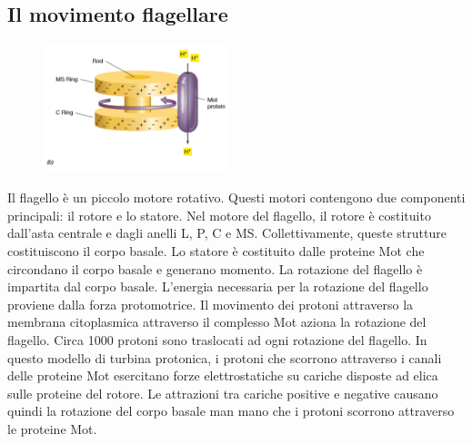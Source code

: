 \subsection{Il movimento flagellare}
\begin{figure}
  \begin{center}
    \includegraphics[width=0.48\textwidth]{Pictures/17.png}
  \end{center}
\end{figure}
Il flagello è un piccolo motore rotativo. Questi motori contengono due componenti principali: il rotore e lo statore. Nel motore del flagello, il rotore è 
costituito dall'asta centrale e dagli anelli L, P, C e MS. Collettivamente, queste strutture costituiscono il corpo basale. Lo statore è costituito dalle 
proteine Mot che circondano il corpo basale e generano momento. La rotazione del flagello è impartita dal corpo basale. L'energia necessaria per la 
rotazione del flagello proviene dalla forza protomotrice. Il movimento dei protoni attraverso la membrana citoplasmica attraverso il complesso Mot aziona la 
rotazione del flagello. Circa 1000 protoni sono traslocati ad ogni rotazione del flagello. In questo modello di turbina protonica, i protoni che scorrono 
attraverso i canali delle proteine Mot esercitano forze elettrostatiche su cariche disposte ad elica sulle proteine del rotore. Le attrazioni tra cariche 
positive e negative causano quindi la rotazione del corpo basale man mano che i protoni scorrono attraverso le proteine Mot.
